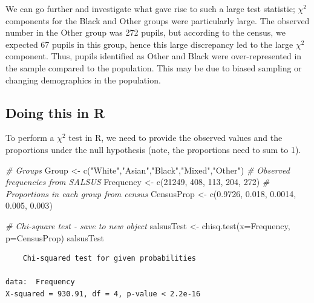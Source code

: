 \documentclass[
  oneside]{krantz}
\newenvironment{Shaded}{\begin{snugshade}}{\end{snugshade}}
\newcommand{\AttributeTok}[1]{\textcolor[rgb]{0.77,0.63,0.00}{#1}}
\newcommand{\CommentTok}[1]{\textcolor[rgb]{0.56,0.35,0.01}{\textit{#1}}}
\newcommand{\DecValTok}[1]{\textcolor[rgb]{0.00,0.00,0.81}{#1}}
\newcommand{\FloatTok}[1]{\textcolor[rgb]{0.00,0.00,0.81}{#1}}
\newcommand{\FunctionTok}[1]{\textcolor[rgb]{0.00,0.00,0.00}{#1}}
\newcommand{\NormalTok}[1]{#1}
\newcommand{\OtherTok}[1]{\textcolor[rgb]{0.56,0.35,0.01}{#1}}
\newcommand{\StringTok}[1]{\textcolor[rgb]{0.31,0.60,0.02}{#1}}
\begin{document}
We can go further and investigate what gave rise to such a large test statistic; \(\chi^2\) components for the Black and Other groups were particularly large. The observed number in the Other group was 272 pupils, but according to the census, we expected 67 pupils in this group, hence this large discrepancy led to the large \(\chi^2\) component. Thus, pupils identified as Other and Black were over-represented in the sample compared to the population. This may be due to biased sampling or changing demographics in the population.

\hypertarget{doing-this-in-r-22}{%
\subsection{Doing this in R}\label{doing-this-in-r-22}}

To perform a \(\chi^2\) test in R, we need to provide the observed values and the proportions under the null hypothesis (note, the proportions need to sum to 1).

\begin{Shaded}
\begin{Highlighting}[]
\CommentTok{\# Groups}
\NormalTok{Group }\OtherTok{\textless{}{-}} \FunctionTok{c}\NormalTok{(}\StringTok{"White"}\NormalTok{,}\StringTok{"Asian"}\NormalTok{,}\StringTok{"Black"}\NormalTok{,}\StringTok{"Mixed"}\NormalTok{,}\StringTok{"Other"}\NormalTok{)}
\CommentTok{\# Observed frequencies from SALSUS}
\NormalTok{Frequency }\OtherTok{\textless{}{-}} \FunctionTok{c}\NormalTok{(}\DecValTok{21249}\NormalTok{, }\DecValTok{408}\NormalTok{, }\DecValTok{113}\NormalTok{, }\DecValTok{204}\NormalTok{, }\DecValTok{272}\NormalTok{)}
\CommentTok{\# Proportions in each group from census}
\NormalTok{CensusProp }\OtherTok{\textless{}{-}} \FunctionTok{c}\NormalTok{(}\FloatTok{0.9726}\NormalTok{, }\FloatTok{0.018}\NormalTok{, }\FloatTok{0.0014}\NormalTok{, }\FloatTok{0.005}\NormalTok{, }\FloatTok{0.003}\NormalTok{)}

\CommentTok{\# Chi{-}square test {-} save to new object}
\NormalTok{salsusTest }\OtherTok{\textless{}{-}} \FunctionTok{chisq.test}\NormalTok{(}\AttributeTok{x=}\NormalTok{Frequency, }\AttributeTok{p=}\NormalTok{CensusProp)}
\NormalTok{salsusTest}
\end{Highlighting}
\end{Shaded}

\begin{verbatim}
    Chi-squared test for given probabilities

data:  Frequency
X-squared = 930.91, df = 4, p-value < 2.2e-16
\end{verbatim}
\end{document}
